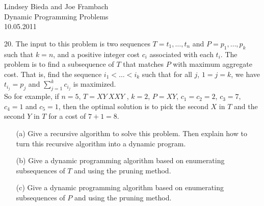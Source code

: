 \documentclass[10pt]{article}
\begin{document}
	\begin{flushright}
	Lindsey Bieda and Joe Frambach\\
	Dynamic Programming Problems\\
	10.05.2011
	\end{flushright}
	20. The input to this problem is two sequences $T = t_1, \ldots, t_n$ and $P = p_1, \ldots, p_k$ such that $k = n$, and
	a positive integer cost $c_i$ associated with each $t_i$.  The problem is to find a subsequence of $T$ that
	matches $P$ with maximum aggregate cost. That is, find the sequence $i_1 < \ldots < i_k$ such that for all $j$,
	$1 = j = k$, we have $t_{i_j} = p_j$ and $\sum_{j=1}^k c_{i_j}$ is maximized.\\
	So for example, if $n = 5$, $T = XY~XXY$ , $k = 2$, $P = XY$, $c_1 = c_2 = 2$, $c_3 = 7$, $c_4 = 1$ and $c_5 = 1$, then
	the optimal solution is to pick the second $X$ in $T$ and the second $Y$ in $T$ for a cost of $7 + 1 = 8$.
	\begin{enumerate}
		\item[(a)]	Give a recursive algorithm to solve this problem. Then explain how to turn this recursive algorithm
								into a dynamic program.
		\item[(b)]	Give a dynamic programming algorithm based on enumerating subsequences of $T$ and using the
								pruning method. 
		\item[(c)]	Give a dynamic programming algorithm based on enumerating subsequences of $P$ and using the
								pruning method.
	\end{enumerate}
\end{document}
